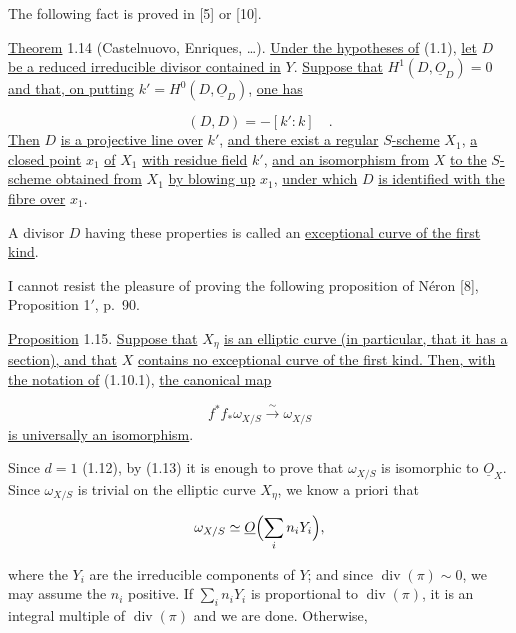
The following fact is proved in [5] or [10].

\underline{Theorem} 1.14 (Castelnuovo, Enriques, \ldots).
\underline{Under the hypotheses of} (1.1), \underline{let} $D$
\underline{be a reduced irreducible divisor contained in} $Y$.
\underline{Suppose that} $H^1(D,\underline{O}_D)=0$ \underline{and that, on putting}
$k'=H^0(D,\underline{O}_D)$, \underline{one has}

\begin{equation*}
(D,D)=-[k':k] \quad .
\end{equation*}
\underline{Then} $D$ \underline{is a projective line over} $k'$, \underline{and
there exist a regular} $S$\underline{-scheme} $X_1$, \underline{a closed point}
$x_1$ \underline{of} $X_1$ \underline{with residue field} $k'$, \underline{and an
isomorphism from} $X$ \underline{to the} $S$\underline{-scheme obtained from}
$X_1$ \underline{by blowing up} $x_1$, \underline{under which} $D$
\underline{is identified with the fibre over} $x_1$.

A divisor $D$ having these properties is called an \underline{exceptional curve
of the first kind}.

I cannot resist the pleasure of proving the following proposition of Néron [8],
Proposition 1$'$, p.~90.

\underline{Proposition} 1.15. \underline{Suppose that} $X_\eta$
\underline{is an elliptic curve (in particular, that it has a section), and that}
$X$ \underline{contains no exceptional curve of the first kind.  Then, with the
notation of} (1.10.1), \underline{the canonical map}

\begin{equation*}
f^*f_*\omega_{X/S}\xrightarrow{\;\sim\;}\omega_{X/S}
\end{equation*}
\underline{is universally an isomorphism}.

Since $d=1$ (1.12), by (1.13) it is enough to prove that $\omega_{X/S}$ is
isomorphic to $\underline{O}_X$.  Since $\omega_{X/S}$ is trivial on the elliptic
curve $X_\eta$, we know a priori that

\begin{equation*}
\omega_{X/S}\simeq\underline{O}\Bigl(\sum_i n_iY_i\Bigr),
\end{equation*}


where the $Y_i$ are the irreducible components of $Y$; and since
$\operatorname{div}(\pi)\sim0$, we may assume the $n_i$ positive.  If
$\sum_i n_iY_i$ is proportional to $\operatorname{div}(\pi)$, it is an integral
multiple of $\operatorname{div}(\pi)$ and we are done.  Otherwise,


